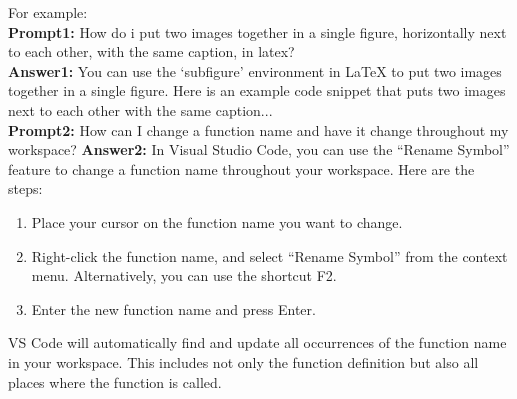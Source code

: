 \documentclass[a4paper,12pt]{article}
\begin{document}
\noindent For example: \\
\noindent \textbf{Prompt1:} How do i put two images together in a single figure, horizontally next to each other, with the same caption, in latex? \\
\noindent \textbf{Answer1:} You can use the `subfigure' environment in LaTeX to put two images together in a single figure. Here is an example code snippet that puts two images next to each other with the same caption... \\
\noindent \textbf{Prompt2:} How can I change a function name and have it change throughout my workspace?
\noindent \textbf{Answer2:} In Visual Studio Code, you can use the ``Rename Symbol'' feature to change a function name throughout your workspace. Here are the steps:
\begin{enumerate}
    \item Place your cursor on the function name you want to change.
    \item Right-click the function name, and select ``Rename Symbol'' from the context menu. Alternatively, you can use the shortcut F2.
    \item Enter the new function name and press Enter.
\end{enumerate}
VS Code will automatically find and update all occurrences of the function name in your workspace. This includes not only the function definition but also all places where the function is called.
\end{document}
